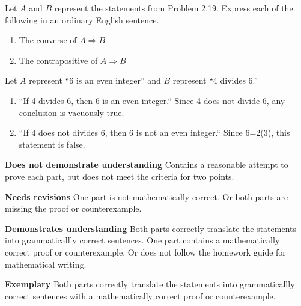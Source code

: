 \documentclass[letterpaper, 11 pt]{../ximera}
\begin{document}
\begin{problem}\label{ernst-prob2.37}%
Let \(A\)  and \(B\)  represent the statements from Problem 2.19. Express each of the following in an ordinary English sentence.%
    \begin{enumerate}[label=(\alph*)]
            \item The converse of \(A\Rightarrow B\)%
            \item The contrapositive of \(A\Rightarrow B\)%
    \end{enumerate}

    \begin{solution}
        Let \(A\)  represent ``6 is an even integer” and \(B\)  represent ``4 divides 6.”%
        \begin{enumerate}[label=(\alph*)]
            \item ``If 4 divides 6, then 6 is an even integer.`` Since 4 does not divide 6, any conclusion is vacuously true.%
            \item ``If 4 does not divides 6, then 6 is not an even integer.`` Since 6=2(3), this statement is false.%
        \end{enumerate}       
    \end{solution}

    \begin{writeRubric}
        \item \textbf{Does not demonstrate understanding}
        Contains a reasonable attempt to prove each part, but does not meet the criteria for two points.
        \item \textbf{Needs revisions}
        One part is not mathematically correct. Or both parts are missing the proof or counterexample.
        \item \textbf{Demonstrates understanding}
        Both parts correctly translate the statements into grammaticallly correct sentences. One part contains a mathematically correct proof or counterexample.  Or does not follow the homework guide for mathematical writing.
        \item \textbf{Exemplary}
        Both parts correctly translate the statements into grammaticallly correct sentences with a mathematically correct proof or counterexample.
    \end{writeRubric}
%
\end{problem}
\end{document}
